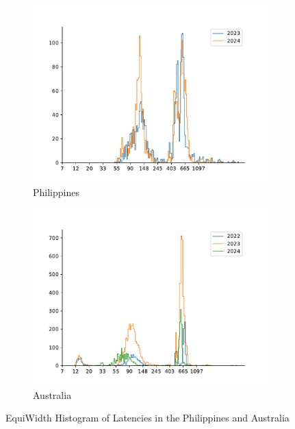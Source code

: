 \begin{figure}
	\centering
	\begin{subfigure}[b]{0.8\linewidth}
		\includegraphics[width=\linewidth]{chapters/4-results/latency/img/histogram_of_latencies_of_starlink_probes_in_philippines.pdf}
		\caption{Philippines}
	\end{subfigure}
	\begin{subfigure}[b]{0.8\linewidth}
		\includegraphics[width=\linewidth]{chapters/4-results/latency/img/histogram_of_latencies_of_starlink_probes_in_australia.pdf}
		\caption{Australia}
	\end{subfigure}
	\caption{EquiWidth Histogram of Latencies in the Philippines and
		Australia}
	\label{fig:latency-histogram-7}
\end{figure}

